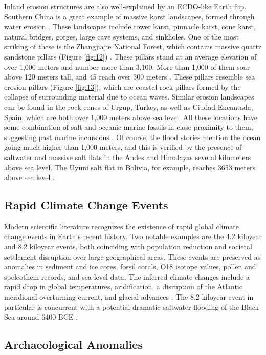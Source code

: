 \documentclass[10pt,twocolumn,letterpaper]{article}
\begin{document}
Inland erosion structures are also well-explained by an ECDO-like Earth flip. Southern China is a great example of massive karst landscapes, formed through water erosion \cite{82}. These landscapes include tower karst, pinnacle karst, cone karst, natural bridges, gorges, large cave systems, and sinkholes. One of the most striking of these is the Zhangjiajie National Forest, which contains massive quartz sandstone pillars (Figure \ref{fig:12}) \cite{84}. These pillars stand at an average elevation of over 1,000 meters and number more than 3,100. More than 1,000 of them soar above 120 meters tall, and 45 reach over 300 meters \cite{85}. These pillars resemble sea erosion pillars (Figure \ref{fig:13}), which are coastal rock pillars formed by the collapse of surrounding material due to ocean waves. Similar erosion landscapes can be found in the rock cones of Urgup, Turkey, as well as Ciudad Encantada, Spain, which are both over 1,000 meters above sea level. All these locations have some combination of salt and oceanic marine fossils in close proximity to them, suggesting past marine incursions \cite{15,86,87}. Of course, the flood stories \cite{3} mention the ocean going much higher than 1,000 meters, and this is verified by the presence of saltwater and massive salt flats in the Andes and Himalayas several kilometers above sea level. The Uyuni salt flat in Bolivia, for example, reaches 3653 meters above sea level \cite{94}.

\subsection{Rapid Climate Change Events}

Modern scientific literature recognizes the existence of rapid global climate change events in Earth's recent history. Two notable examples are the 4.2 kiloyear and 8.2 kiloyear events, both coinciding with population reduction and societal settlement disruption over large geographical areas. These events are preserved as anomalies in sediment and ice cores, fossil corals, O18 isotope values, pollen and speleothem records, and sea-level data. The inferred climate changes include a rapid drop in global temperatures, aridification, a disruption of the Atlantic meridional overturning current, and glacial advances \cite{90,91,92}. The 8.2 kiloyear event in particular is concurrent with a potential dramatic saltwater flooding of the Black Sea around 6400 BCE \cite{93}.

\subsection{Archaeological Anomalies}
\end{document}
